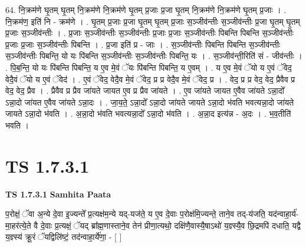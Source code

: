 \documentclass[17pt]{extarticle}
\begin{document}
64. नि॒क्रम॑णे घृ॒तम् घृ॒तम् नि॒क्रम॑णे नि॒क्रम॑णे घृ॒तम् प्र॒जाः प्र॒जा घृ॒तम् नि॒क्रम॑णे नि॒क्रम॑णे घृ॒तम् प्र॒जाः । . नि॒क्रम॑ण॒ इति॑ नि - क्रम॑णे । . घृ॒तम् प्र॒जाः प्र॒जा घृ॒तम् घृ॒तम् प्र॒जाः स॒ञ्जीव॑न्तीः स॒ञ्जीव॑न्तीः प्र॒जा घृ॒तम् घृ॒तम् प्र॒जाः स॒ञ्जीव॑न्तीः । . प्र॒जाः स॒ञ्जीव॑न्तीः स॒ञ्जीव॑न्तीः प्र॒जाः प्र॒जाः स॒ञ्जीव॑न्तीः पिबन्ति पिबन्ति स॒ञ्जीव॑न्तीः प्र॒जाः प्र॒जाः स॒ञ्जीव॑न्तीः पिबन्ति । . प्र॒जा इति॑ प्र - जाः । . स॒ञ्जीव॑न्तीः पिबन्ति पिबन्ति स॒ञ्जीव॑न्तीः स॒ञ्जीव॑न्तीः पिबन्ति॒ यो यः पि॑बन्ति स॒ञ्जीव॑न्तीः स॒ञ्जीव॑न्तीः पिबन्ति॒ यः । . स॒ञ्जीव॑न्ती॒रिति॑ सं - जीव॑न्तीः । . पि॒ब॒न्ति॒ यो यः पि॑बन्ति पिबन्ति॒ य ए॒व मे॒वं ॅयः पि॑बन्ति पिबन्ति॒ य ए॒वम् । . य ए॒व मे॒वं ॅयो य ए॒वं ॅवेद॒ वेदै॒वं ॅयो य ए॒वं ॅवेद॑ । . ए॒वं ॅवेद॒ वेदै॒व मे॒वं ॅवेद॒ प्र प्र वेदै॒व मे॒वं ॅवेद॒ प्र । . वेद॒ प्र प्र वेद॒ वेद॒ प्रैवैव प्र वेद॒ वेद॒ प्रैव । . प्रैवैव प्र प्रैव जा॑यते जायत ए॒व प्र प्रैव जा॑यते । . ए॒व जा॑यते जायत ए॒वैव जा॑यते ऽन्ना॒दो᳚ ऽन्ना॒दो जा॑यत ए॒वैव जा॑यते ऽन्ना॒दः । . जा॒य॒ते॒ ऽन्ना॒दो᳚ ऽन्ना॒दो जा॑यते जायते ऽन्ना॒दो भ॑वति भवत्यन्ना॒दो जा॑यते जायते ऽन्ना॒दो भ॑वति । . अ॒न्ना॒दो भ॑वति भवत्यन्ना॒दो᳚ ऽन्ना॒दो भ॑वति । . अ॒न्ना॒द इत्य॑न्न - अ॒दः । . भ॒व॒तीति॑ भवति । \newline
\pagebreak
{}
\section*{ TS 1.7.3.1 }

\textbf{TS 1.7.3.1 } \newline
\textbf{Samhita Paata} \newline

प॒रोक्षं॒ ॅवा अ॒न्ये दे॒वा इ॒ज्यन्ते᳚ प्र॒त्यक्ष॑म॒न्ये यद्-यज॑ते॒ य ए॒व दे॒वाः प॒रोक्ष॑मि॒ज्यन्ते॒ ताने॒व तद्-य॑जति॒ यद॑न्वाहा॒र्य॑-मा॒हर॑त्ये॒ते वै दे॒वाः प्र॒त्यक्षं॒ ॅयद् ब्रा᳚ह्म॒णास्ताने॒व तेन॑ प्रीणा॒त्यथो॒ दक्षि॑णै॒वास्यै॒षाऽथो॑ य॒ज्ञ्स्यै॒व छि॒द्रमपि॑ दधाति॒ यद्वै य॒ज्ञ्स्य॑ क्रू॒रं ॅयद्विलि॑ष्टं॒ तद॑न्वाहा॒र्ये॑णा॒ - [ ] \newline
\end{document}
